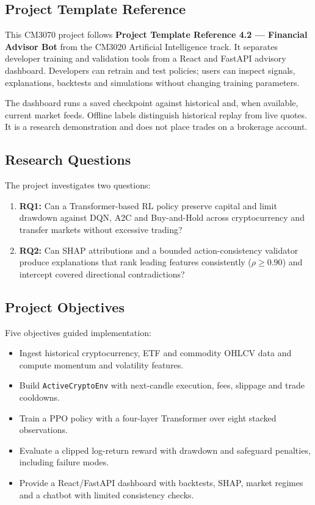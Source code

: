 \documentclass[11pt,a4paper]{article}
\begin{document}
\subsection{Project Template Reference}
This CM3070 project follows \textbf{Project Template Reference 4.2 --- Financial Advisor Bot} from the CM3020 Artificial Intelligence track. It separates developer training and validation tools from a React and FastAPI advisory dashboard. Developers can retrain and test policies; users can inspect signals, explanations, backtests and simulations without changing training parameters.

The dashboard runs a saved checkpoint against historical and, when available, current market feeds. Offline labels distinguish historical replay from live quotes. It is a research demonstration and does not place trades on a brokerage account.

\subsection{Research Questions}
The project investigates two questions:
\begin{enumerate}[leftmargin=2em]
    \item \textbf{RQ1:} Can a Transformer-based RL policy preserve capital and limit drawdown against DQN, A2C and Buy-and-Hold across cryptocurrency and transfer markets without excessive trading?
    \item \textbf{RQ2:} Can SHAP attributions and a bounded action-consistency validator produce explanations that rank leading features consistently ($\rho \ge 0.90$) and intercept covered directional contradictions?
\end{enumerate}

\subsection{Project Objectives}
Five objectives guided implementation:
\begin{itemize}[leftmargin=2em]
    \item Ingest historical cryptocurrency, ETF and commodity OHLCV data and compute momentum and volatility features.
    \item Build \texttt{ActiveCryptoEnv} with next-candle execution, fees, slippage and trade cooldowns.
    \item Train a PPO policy with a four-layer Transformer over eight stacked observations.
    \item Evaluate a clipped log-return reward with drawdown and safeguard penalties, including failure modes.
    \item Provide a React/FastAPI dashboard with backtests, SHAP, market regimes and a chatbot with limited consistency checks.
\end{itemize}
\end{document}
